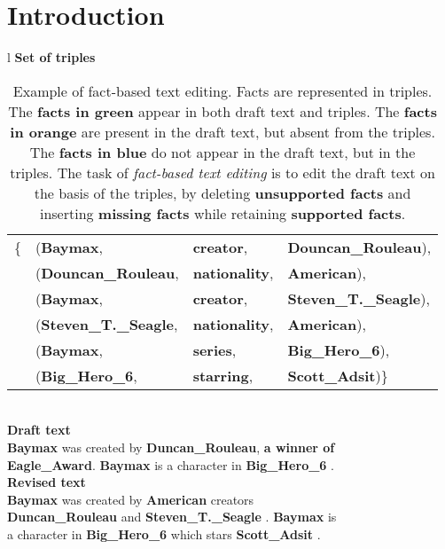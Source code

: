 \documentclass[11pt,a4paper]{article}
\newcommand{\orange}[1]{{\color[HTML]{ff7f0e}\textbf{#1}}}
\newcommand{\blue}[1]{{\color[HTML]{1f77b4}\textbf{#1}}}
\newcommand{\green}[1]{{\color[HTML]{2ca02c}\textbf{#1}}}
\begin{document}
\section{Introduction}
\begin{table}[t]
    \centering
    \small
    \begin{tabular}{l}
        \toprule
        \textbf{Set of triples} \\
        \begin{tabular}{@{}c@{}l@{\;}l@{\;}l@{}}
            \{ & (\green{Baymax}, & \green{creator}, & \green{Douncan\_Rouleau}),\\
             & (\blue{Douncan\_Rouleau}, & \blue{nationality}, & \blue{American}),\\
             & (\blue{Baymax}, & \blue{creator}, & \blue{Steven\_T.\_Seagle}),\\
              & (\blue{Steven\_T.\_Seagle}, & \blue{nationality}, & \blue{American}),\\
             & (\green{Baymax}, & \green{series},& \green{Big\_Hero\_6}),\\
             & (\blue{Big\_Hero\_6}, & \blue{starring}, &\blue{Scott\_Adsit})\}
        \end{tabular}\\
        \midrule
        \textbf{Draft text}\\
        \green{Baymax} was created by \green{Duncan\_Rouleau}, \orange{a winner of}\\
        \orange{Eagle\_Award}.
        \green{Baymax} is a character in \green{Big\_Hero\_6} .\\
        \midrule
        \textbf{Revised text}\\
        \green{Baymax} was created by \blue{American} creators\\
        \green{Duncan\_Rouleau} and \blue{Steven\_T.\_Seagle} . \green{Baymax} is\\
        a character in \green{Big\_Hero\_6} which stars \blue{Scott\_Adsit} .\\
        \bottomrule
    \end{tabular}
    \caption{Example of fact-based text editing. Facts are represented in triples. The \green{facts in green} appear in both draft text and triples.  The \orange{facts in orange} are present in the draft text, but absent from the triples. The \blue{facts in blue} do not appear in the draft text, but in the triples.  The task of \textit{fact-based text editing} is to edit the draft text on the basis of the triples, by deleting \orange{unsupported facts} and inserting \blue{missing facts} while retaining \green{supported facts}.}
    \label{tab:problem}
\end{table}
\end{document}
